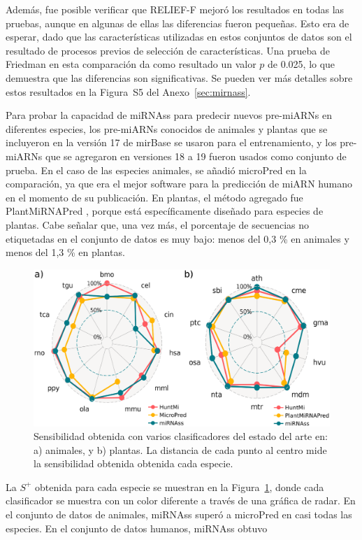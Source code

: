 Además, fue posible verificar que RELIEF-F mejoró los resultados en todas las pruebas, aunque en algunas de ellas las diferencias fueron pequeñas. Esto era
de esperar, dado que las características utilizadas en estos conjuntos de datos son el resultado de procesos previos de selección de características. Una
prueba de Friedman en esta comparación da como resultado un valor $ p $ de 0.025, lo que demuestra que las diferencias son significativas. Se pueden ver más
detalles sobre estos resultados en la Figura~S5 del Anexo~\ref{sec:mirnass}.

Para probar la capacidad de miRNAss para predecir nuevos pre-miARNs en diferentes especies, los pre-miARNs conocidos de animales y plantas que se incluyeron en
la versión 17 de mirBase se usaron para el entrenamiento, y los pre-miARNs que se agregaron en versiones 18 a 19 fueron usados como conjunto de prueba. En el caso de las especies
animales, se añadió microPred \citep{batuwita2009micropred} en la comparación, ya que era el mejor software para la predicción de miARN humano en el
momento de su publicación. En plantas, el método agregado fue PlantMiRNAPred \citep{xuan2011plantmirnapred}, porque está específicamente diseñado para
especies de plantas. Cabe señalar que, una vez más, el porcentaje de secuencias no etiquetadas en el conjunto de datos es muy bajo: menos del 0,3 \% en
animales y menos del 1,3 \% en plantas.
\begin{figure}[t]
	\centering
	\includegraphics[width=0.6\linewidth]{fig/delta_mirbase_radar.eps}
	\caption[Sensibilidad en animales y plantas]{Sensibilidad obtenida con varios clasificadores del estado del arte en: a) animales, y b) plantas.
		La distancia de cada punto al centro mide la sensibilidad obtenida obtenida cada especie.}
	\label{fig:deltaRadar}
\end{figure}
La $S^{+}$ obtenida para cada especie se muestran en la Figura~\ref{fig:deltaRadar}, donde cada clasificador se muestra con un color diferente a través de una
gráfica de radar. En el conjunto de datos de animales, miRNAss superó a microPred en casi todas las especies. En el conjunto de datos humanos, miRNAss obtuvo
